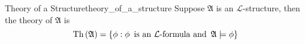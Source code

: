 \begin{definition}{Theory of a Structure}{theory_of_a_structure}
Suppose \( \mathfrak{ A }   \) is an \( \mathcal{ L }   \)-structure, then the
theory of \( \mathfrak{ A }   \) is 
\[
\operatorname{ Th } \left( \mathfrak{ A }   \right)  =  \left\{ \phi : \phi
\enspace \text{is an \( \mathcal{ L }\)-formula and} \enspace  \mathfrak{ A }
\models \phi \right\} 
\]
\end{definition}
